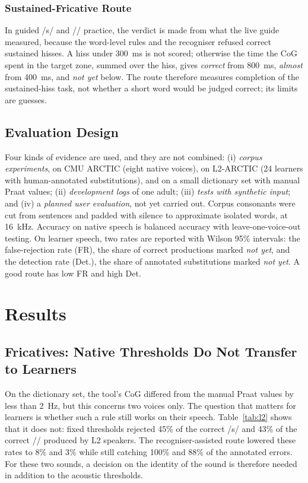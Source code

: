 \documentclass[engproc,article,submit,moreauthors]{Definitions/mdpi}
\newcommand{\ipa}[1]{/#1/}
\begin{document}
\subsubsection{Sustained-Fricative Route}
In guided \ipa{s} and \ipa{\textesh} practice, the verdict is made from what the live guide measured, because the word-level rules and the recogniser refused correct sustained hisses. A hiss under 300~ms is not scored; otherwise the time the CoG spent in the target zone, summed over the hiss, gives \textit{correct} from 800~ms, \textit{almost} from 400~ms, and \textit{not yet} below. The route therefore measures completion of the sustained-hiss task, not whether a short word would be judged correct; its limits are guesses.

\subsection{Evaluation Design}
Four kinds of evidence are used, and they are not combined: (i) \emph{corpus experiments}, on CMU ARCTIC \cite{kominek2004} (eight native voices), on L2-ARCTIC \cite{zhao2018} (24 learners with human-annotated substitutions), and on a small dictionary set with manual Praat values; (ii) \emph{development logs} of one adult; (iii) \emph{tests with synthetic input}; and (iv) a \emph{planned user evaluation}, not yet carried out. Corpus consonants were cut from sentences and padded with silence to approximate isolated words, at 16~kHz. Accuracy on native speech is balanced accuracy with leave-one-voice-out testing. On learner speech, two rates are reported with Wilson 95\% intervals: the false-rejection rate (FR), the share of correct productions marked \textit{not yet}, and the detection rate (Det.), the share of annotated substitutions marked \textit{not yet}. A good route has low FR and high Det.

\section{Results}\label{sec:results}
\subsection{Fricatives: Native Thresholds Do Not Transfer to Learners}
On the dictionary set, the tool's CoG differed from the manual Praat values by less than 2~Hz, but this concerns two voices only. The question that matters for learners is whether such a rule still works on their speech. Table~\ref{tab:l2} shows that it does not: fixed thresholds rejected 45\% of the correct \ipa{s} and 43\% of the correct \ipa{\textesh} produced by L2 speakers. The recogniser-assisted route lowered these rates to 8\% and 3\% while still catching 100\% and 88\% of the annotated errors. For these two sounds, a decision on the identity of the sound is therefore needed in addition to the acoustic thresholds.
\end{document}
